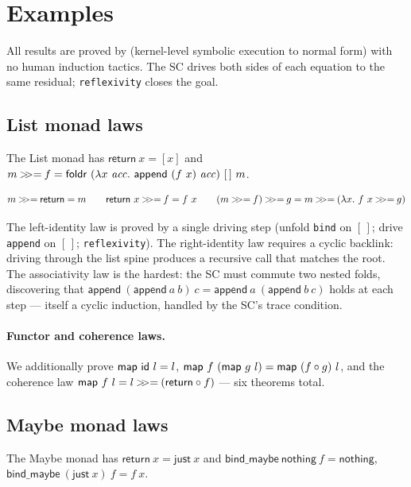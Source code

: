 \section{Examples}
\label{sec:examples}

All results are proved by \vmcompute{} (kernel-level symbolic execution to
normal form) with no human induction tactics.  The SC drives both sides of each
equation to the same residual; \texttt{reflexivity} closes the goal.

\subsection{List monad laws}

The List monad has $\mathsf{return}\ x = [x]$ and
$m \bind f = \mathsf{foldr}\ (\lambda x\ \mathit{acc}.\ \mathsf{append}\ (f\ x)\ \mathit{acc})\ [\,]\ m$.

\begin{theorem}
\[
  m \bind \mathsf{return} = m
  \qquad
  \mathsf{return}\ x \bind f = f\ x
  \qquad
  (m \bind f) \bind g = m \bind (\lambda x.\ f\ x \bind g)
\]
\end{theorem}

\noindent
The left-identity law is proved by a single driving step (unfold \texttt{bind}
on $[\,]$; drive \texttt{append} on $[\,]$; \texttt{reflexivity}).  The
right-identity law requires a cyclic backlink: driving through the list spine
produces a recursive call that matches the root.  The associativity law is the
hardest: the SC must commute two nested folds, discovering that
$\mathsf{append}\ (\mathsf{append}\ a\ b)\ c = \mathsf{append}\ a\ (\mathsf{append}\ b\ c)$
holds at each step --- itself a cyclic induction, handled by the SC's
trace condition.

\paragraph{Functor and coherence laws.}
We additionally prove $\mathsf{map}\ \mathsf{id}\ l = l$, $\mathsf{map}\ f\ (\mathsf{map}\ g\ l) =
\mathsf{map}\ (f \circ g)\ l$, and the coherence law $\mathsf{map}\ f\ l = l \mathbin{>\!\!>=}
(\mathsf{return} \circ f)$ --- six theorems total.

\subsection{Maybe monad laws}

The Maybe monad has $\mathsf{return}\ x = \mathsf{just}\ x$ and
$\mathsf{bind\_maybe}\ \mathsf{nothing}\ f = \mathsf{nothing}$,
$\mathsf{bind\_maybe}\ (\mathsf{just}\ x)\ f = f\ x$.


